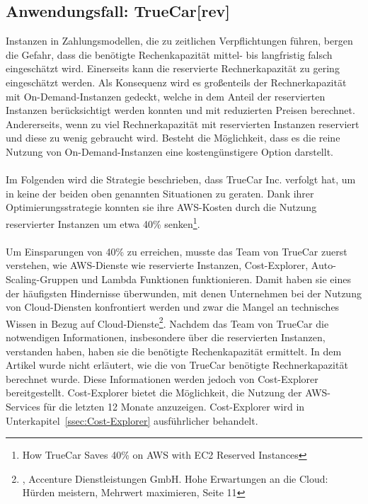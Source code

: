 \subsection{Anwendungsfall: TrueCar[rev]}\label{ssec:UseCaseTrueCar}
Instanzen in Zahlungsmodellen, die zu zeitlichen Verpflichtungen führen, bergen die Gefahr, dass die benötigte Rechenkapazität mittel- bis langfristig falsch eingeschätzt wird. Einerseits kann die reservierte Rechnerkapazität zu gering eingeschätzt werden. Als Konsequenz wird es großenteils der Rechnerkapazität mit On-Demand-Instanzen gedeckt, welche in dem Anteil der reservierten Instanzen berücksichtigt werden konnten und mit reduzierten Preisen berechnet. Andererseits, wenn zu viel Rechnerkapazität mit reservierten Instanzen reserviert und diese zu wenig gebraucht wird. Besteht die Möglichkeit, dass es die reine Nutzung von On-Demand-Instanzen eine kostengünstigere Option darstellt.
\\\\
Im Folgenden wird die Strategie beschrieben, dass TrueCar Inc. verfolgt hat, um in keine der beiden oben genannten Situationen zu geraten. Dank ihrer Optimierungsstrategie konnten sie ihre AWS-Kosten durch die Nutzung reservierter Instanzen um etwa 40\% senken\footnote{\cite{MED1}How TrueCar Saves 40\% on AWS with EC2 Reserved Instances}.
\\\\
Um Einsparungen von 40\% zu erreichen, musste das Team von TrueCar zuerst verstehen, wie AWS-Dienste wie reservierte Instanzen, Cost-Explorer, Auto-Scaling-Gruppen und Lambda Funktionen funktionieren. Damit haben sie eines der häufigsten Hindernisse überwunden, mit denen Unternehmen bei der Nutzung von Cloud-Diensten konfrontiert werden und zwar die Mangel an technisches Wissen in Bezug auf Cloud-Dienste\footnote{\cite{ACC1}, Accenture Dienstleistungen GmbH. Hohe Erwartungen an die Cloud: Hürden meistern, Mehrwert maximieren, Seite 11}. Nachdem das Team von TrueCar die notwendigen Informationen, insbesondere über die reservierten Instanzen, verstanden haben, haben sie die benötigte Rechenkapazität ermittelt. In dem Artikel wurde nicht erläutert, wie die von TrueCar benötigte Rechnerkapazität berechnet wurde. Diese Informationen werden jedoch von Cost-Explorer bereitgestellt. Cost-Explorer bietet die Möglichkeit, die Nutzung der AWS-Services für die letzten 12 Monate anzuzeigen. Cost-Explorer wird in Unterkapitel~\ref{ssec:Cost-Explorer} ausführlicher behandelt.

